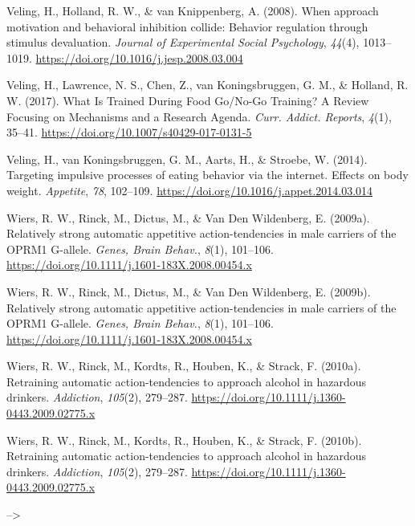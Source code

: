 \documentclass[man,floatsintext]{apa6}
\begin{document}
\leavevmode\hypertarget{ref-veling_when_2008}{}%
Veling, H., Holland, R. W., \& van Knippenberg, A. (2008). When approach motivation and behavioral inhibition collide: Behavior regulation through stimulus devaluation. \emph{Journal of Experimental Social Psychology}, \emph{44}(4), 1013--1019. \url{https://doi.org/10.1016/j.jesp.2008.03.004}

\leavevmode\hypertarget{ref-veling_what_2017}{}%
Veling, H., Lawrence, N. S., Chen, Z., van Koningsbruggen, G. M., \& Holland, R. W. (2017). What Is Trained During Food Go/No-Go Training? A Review Focusing on Mechanisms and a Research Agenda. \emph{Curr. Addict. Reports}, \emph{4}(1), 35--41. \url{https://doi.org/10.1007/s40429-017-0131-5}

\leavevmode\hypertarget{ref-veling_targeting_2014}{}%
Veling, H., van Koningsbruggen, G. M., Aarts, H., \& Stroebe, W. (2014). Targeting impulsive processes of eating behavior via the internet. Effects on body weight. \emph{Appetite}, \emph{78}, 102--109. \url{https://doi.org/10.1016/j.appet.2014.03.014}

\leavevmode\hypertarget{ref-wiers_relatively_2009}{}%
Wiers, R. W., Rinck, M., Dictus, M., \& Van Den Wildenberg, E. (2009a). Relatively strong automatic appetitive action-tendencies in male carriers of the OPRM1 G-allele. \emph{Genes, Brain Behav.}, \emph{8}(1), 101--106. \url{https://doi.org/10.1111/j.1601-183X.2008.00454.x}

\leavevmode\hypertarget{ref-wiersRelativelyStrongAutomatic2009}{}%
Wiers, R. W., Rinck, M., Dictus, M., \& Van Den Wildenberg, E. (2009b). Relatively strong automatic appetitive action-tendencies in male carriers of the OPRM1 G-allele. \emph{Genes, Brain Behav.}, \emph{8}(1), 101--106. \url{https://doi.org/10.1111/j.1601-183X.2008.00454.x}

\leavevmode\hypertarget{ref-wiers_retraining_2010}{}%
Wiers, R. W., Rinck, M., Kordts, R., Houben, K., \& Strack, F. (2010a). Retraining automatic action-tendencies to approach alcohol in hazardous drinkers. \emph{Addiction}, \emph{105}(2), 279--287. \url{https://doi.org/10.1111/j.1360-0443.2009.02775.x}

\leavevmode\hypertarget{ref-wiersRetrainingAutomaticAction2010}{}%
Wiers, R. W., Rinck, M., Kordts, R., Houben, K., \& Strack, F. (2010b). Retraining automatic action-tendencies to approach alcohol in hazardous drinkers. \emph{Addiction}, \emph{105}(2), 279--287. \url{https://doi.org/10.1111/j.1360-0443.2009.02775.x}

\endgroup --\textgreater{}
\end{document}
